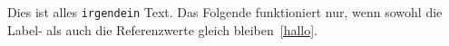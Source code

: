 Dies ist alles \texttt{irgendein} Text.
\label{hallo}
Das Folgende funktioniert nur, wenn sowohl die Label- als auch die Referenzwerte gleich bleiben~\ref{hallo}.

